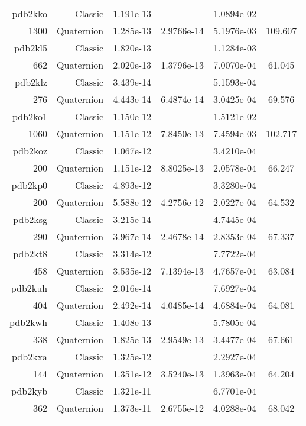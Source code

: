 \begin{xltabular}{\textwidth}{r|rS[table-format=1.3e+2]S[table-format=1.4e+2]S[table-format=1.4e+2]S[table-format=-1.3]}
pdb2kko & Classic & 1.191e-13 &  & 1.0894e-02 & \\
1300 & Quaternion & 1.285e-13 & 2.9766e-14 & 5.1976e-03 & 109.607\\  \addlinespace
pdb2kl5 & Classic & 1.820e-13 &  & 1.1284e-03 & \\
662 & Quaternion & 2.020e-13 & 1.3796e-13 & 7.0070e-04 & 61.045\\  \addlinespace
pdb2klz & Classic & 3.439e-14 &  & 5.1593e-04 & \\
276 & Quaternion & 4.443e-14 & 6.4874e-14 & 3.0425e-04 & 69.576\\  \addlinespace
pdb2ko1 & Classic & 1.150e-12 &  & 1.5121e-02 & \\
1060 & Quaternion & 1.151e-12 & 7.8450e-13 & 7.4594e-03 & 102.717\\  \addlinespace
pdb2koz & Classic & 1.067e-12 &  & 3.4210e-04 & \\
200 & Quaternion & 1.151e-12 & 8.8025e-13 & 2.0578e-04 & 66.247\\  \addlinespace
pdb2kp0 & Classic & 4.893e-12 &  & 3.3280e-04 & \\
200 & Quaternion & 5.588e-12 & 4.2756e-12 & 2.0227e-04 & 64.532\\  \addlinespace
pdb2ksg & Classic & 3.215e-14 &  & 4.7445e-04 & \\
290 & Quaternion & 3.967e-14 & 2.4678e-14 & 2.8353e-04 & 67.337\\  \addlinespace
pdb2kt8 & Classic & 3.314e-12 &  & 7.7722e-04 & \\
458 & Quaternion & 3.535e-12 & 7.1394e-13 & 4.7657e-04 & 63.084\\  \addlinespace
pdb2kuh & Classic & 2.016e-14 &  & 7.6927e-04 & \\
404 & Quaternion & 2.492e-14 & 4.0485e-14 & 4.6884e-04 & 64.081\\  \addlinespace
pdb2kwh & Classic & 1.408e-13 &  & 5.7805e-04 & \\
338 & Quaternion & 1.825e-13 & 2.9549e-13 & 3.4477e-04 & 67.661\\  \addlinespace
pdb2kxa & Classic & 1.325e-12 &  & 2.2927e-04 & \\
144 & Quaternion & 1.351e-12 & 3.5240e-13 & 1.3963e-04 & 64.204\\  \addlinespace
pdb2kyb & Classic & 1.321e-11 &  & 6.7701e-04 & \\
362 & Quaternion & 1.373e-11 & 2.6755e-12 & 4.0288e-04 & 68.042\\  \addlinespace

\end{xltabular}
